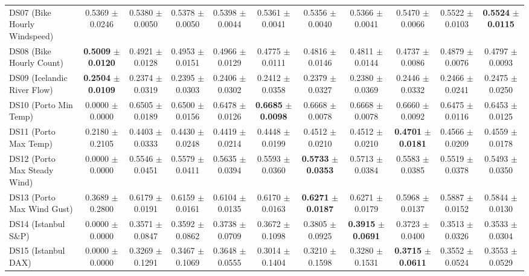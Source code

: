 \begin{table}[t]
{{\begin{tabular}{lcccccccccc}
DS07 (Bike Hourly Windspeed) & 0.5369 $\pm$ 0.0246 & 0.5380 $\pm$ 0.0050 & 0.5378 $\pm$ 0.0050 & 0.5398 $\pm$ 0.0044 & 0.5361 $\pm$ 0.0041 & 0.5356 $\pm$ 0.0040 & 0.5366 $\pm$ 0.0041 & 0.5470 $\pm$ 0.0066 & 0.5522 $\pm$ 0.0103 & \textbf{0.5524} $\pm$ \textbf{0.0115} \\
DS08 (Bike Hourly Count) & \textbf{0.5009} $\pm$ \textbf{0.0120} & 0.4921 $\pm$ 0.0128 & 0.4953 $\pm$ 0.0151 & 0.4966 $\pm$ 0.0129 & 0.4775 $\pm$ 0.0111 & 0.4816 $\pm$ 0.0146 & 0.4811 $\pm$ 0.0144 & 0.4737 $\pm$ 0.0086 & 0.4879 $\pm$ 0.0076 & 0.4797 $\pm$ 0.0093 \\
DS09 (Icelandic River Flow) & \textbf{0.2504} $\pm$ \textbf{0.0109} & 0.2374 $\pm$ 0.0319 & 0.2395 $\pm$ 0.0303 & 0.2406 $\pm$ 0.0302 & 0.2412 $\pm$ 0.0358 & 0.2379 $\pm$ 0.0327 & 0.2380 $\pm$ 0.0369 & 0.2446 $\pm$ 0.0332 & 0.2466 $\pm$ 0.0241 & 0.2475 $\pm$ 0.0250 \\
DS10 (Porto Min Temp) & 0.0000 $\pm$ 0.0000 & 0.6505 $\pm$ 0.0189 & 0.6500 $\pm$ 0.0156 & 0.6478 $\pm$ 0.0126 & \textbf{0.6685} $\pm$ \textbf{0.0098} & 0.6668 $\pm$ 0.0078 & 0.6668 $\pm$ 0.0078 & 0.6660 $\pm$ 0.0092 & 0.6475 $\pm$ 0.0116 & 0.6453 $\pm$ 0.0125 \\
DS11 (Porto Max Temp) & 0.2180 $\pm$ 0.2105 & 0.4403 $\pm$ 0.0333 & 0.4430 $\pm$ 0.0248 & 0.4419 $\pm$ 0.0214 & 0.4448 $\pm$ 0.0199 & 0.4512 $\pm$ 0.0210 & 0.4512 $\pm$ 0.0210 & \textbf{0.4701} $\pm$ \textbf{0.0181} & 0.4566 $\pm$ 0.0209 & 0.4559 $\pm$ 0.0178 \\
DS12 (Porto Max Steady Wind) & 0.0000 $\pm$ 0.0000 & 0.5546 $\pm$ 0.0451 & 0.5579 $\pm$ 0.0411 & 0.5635 $\pm$ 0.0394 & 0.5593 $\pm$ 0.0360 & \textbf{0.5733} $\pm$ \textbf{0.0353} & 0.5713 $\pm$ 0.0384 & 0.5583 $\pm$ 0.0385 & 0.5519 $\pm$ 0.0378 & 0.5493 $\pm$ 0.0350 \\
DS13 (Porto Max Wind Gust) & 0.3689 $\pm$ 0.2800 & 0.6179 $\pm$ 0.0191 & 0.6159 $\pm$ 0.0161 & 0.6104 $\pm$ 0.0135 & 0.6170 $\pm$ 0.0163 & \textbf{0.6271} $\pm$ \textbf{0.0187} & 0.6271 $\pm$ 0.0179 & 0.5968 $\pm$ 0.0137 & 0.5887 $\pm$ 0.0152 & 0.5844 $\pm$ 0.0130 \\
DS14 (Istanbul S\&P) & 0.0000 $\pm$ 0.0000 & 0.3571 $\pm$ 0.0847 & 0.3592 $\pm$ 0.0862 & 0.3738 $\pm$ 0.0709 & 0.3672 $\pm$ 0.1098 & 0.3805 $\pm$ 0.0925 & \textbf{0.3915} $\pm$ \textbf{0.0691} & 0.3723 $\pm$ 0.0400 & 0.3513 $\pm$ 0.0326 & 0.3533 $\pm$ 0.0304 \\
DS15 (Istanbul DAX) & 0.0000 $\pm$ 0.0000 & 0.3269 $\pm$ 0.1291 & 0.3467 $\pm$ 0.1069 & 0.3648 $\pm$ 0.0555 & 0.3014 $\pm$ 0.1404 & 0.3210 $\pm$ 0.1598 & 0.3280 $\pm$ 0.1531 & \textbf{0.3715} $\pm$ \textbf{0.0611} & 0.3552 $\pm$ 0.0524 & 0.3553 $\pm$ 0.0529 \\

\end{tabular}}}
\end{table}
